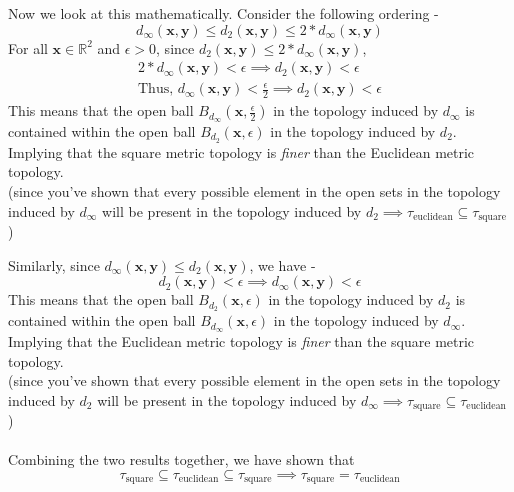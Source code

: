 \begin{frame}
    Now we look at this mathematically. Consider the following ordering -
    \begin{equation*}
        d_\infty(\boldsymbol{x}, \boldsymbol{y}) \leq d_2(\boldsymbol{x}, \boldsymbol{y}) \leq 2*d_\infty(\boldsymbol{x}, \boldsymbol{y})
    \end{equation*}
    For all $\boldsymbol{x} \in \mathbb{R}^2$ and $\epsilon > 0$, since $d_2(\boldsymbol{x}, \boldsymbol{y}) \leq 2*d_\infty(\boldsymbol{x}, \boldsymbol{y})$,
    \begin{gather*}
         2*d_\infty(\boldsymbol{x}, \boldsymbol{y}) < \epsilon \implies d_2(\boldsymbol{x}, \boldsymbol{y}) < \epsilon \\
         \text{Thus, }d_\infty(\boldsymbol{x}, \boldsymbol{y}) < \frac{\epsilon}{2} \implies d_2(\boldsymbol{x}, \boldsymbol{y}) < \epsilon
    \end{gather*}
    This means that the open ball $B_{d_\infty}\left(\boldsymbol{x}, \frac{\epsilon}{2}\right)$ in the topology induced by $d_{\infty}$ is contained within the open ball $B_{d_2}\left(\boldsymbol{x}, \epsilon\right)$ in the topology induced by $d_2$. Implying that the square metric topology is \textit{finer} than the Euclidean metric topology. \\
    (since you've shown that every possible element in the open sets in the topology induced by $d_\infty$ will be present in the topology induced by $d_2 \implies \tau_{\text{euclidean}} \subseteq \tau_{\text{square}}$)
\end{frame}

\begin{frame}
    Similarly, since $d_\infty(\boldsymbol{x}, \boldsymbol{y}) \leq d_2(\boldsymbol{x}, \boldsymbol{y})$, we have -
    \begin{equation*}
        d_2(\boldsymbol{x}, \boldsymbol{y}) < \epsilon \implies d_\infty(\boldsymbol{x}, \boldsymbol{y}) < \epsilon
    \end{equation*}
    This means that the open ball $B_{d_2}\left(\boldsymbol{x}, \epsilon\right)$ in the topology induced by $d_2$ is contained within the open ball $B_{d_\infty}\left(\boldsymbol{x}, \epsilon\right)$ in the topology induced by $d_\infty$. Implying that the Euclidean metric topology is \textit{finer} than the square metric topology. \\
    (since you've shown that every possible element in the open sets in the topology induced by $d_2$ will be present in the topology induced by $d_\infty \implies \tau_{\text{square}} \subseteq \tau_{\text{euclidean}}$) \\\\
    Combining the two results together, we have shown that 
    \begin{equation*}
        \tau_{\text{square}} \subseteq \tau_{\text{euclidean}} \subseteq \tau_{\text{square}} \implies \tau_{\text{square}} = \tau_{\text{euclidean}}
    \end{equation*}
\end{frame}

